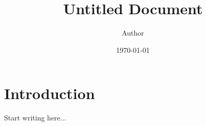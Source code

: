 \documentclass[12pt]{article}
\title{Untitled Document}
\author{Author}
\date{\today}
\begin{document}
\maketitle

\section{Introduction}
Start writing here...
\end{document}
